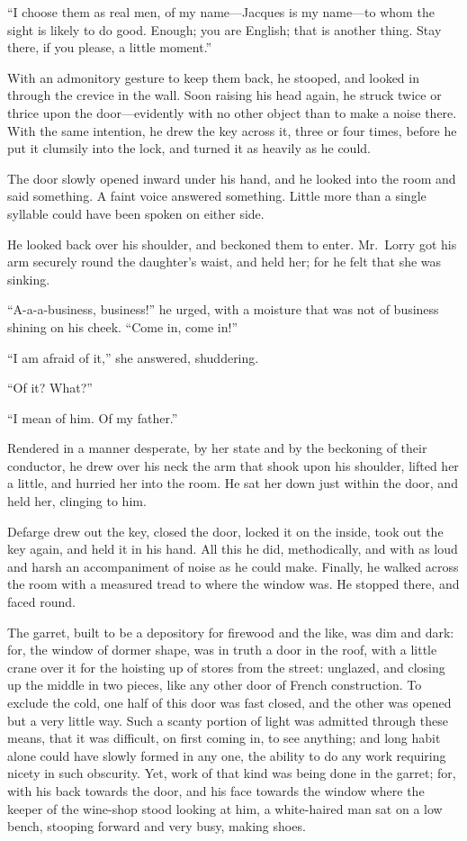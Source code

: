 ``I choose them as real men, of my name---Jacques is my name---to whom
the sight is likely to do good.  Enough; you are English; that is
another thing.  Stay there, if you please, a little moment.''

With an admonitory gesture to keep them back, he stooped, and looked
in through the crevice in the wall.  Soon raising his head again, he
struck twice or thrice upon the door---evidently with no other object
than to make a noise there.  With the same intention, he drew the key
across it, three or four times, before he put it clumsily into the
lock, and turned it as heavily as he could.

The door slowly opened inward under his hand, and he looked into the
room and said something.  A faint voice answered something.  Little
more than a single syllable could have been spoken on either side.

He looked back over his shoulder, and beckoned them to enter.
Mr.\ Lorry got his arm securely round the daughter's waist, and held
her; for he felt that she was sinking.

``A-a-a-business, business!'' he urged, with a moisture that was not of
business shining on his cheek.  ``Come in, come in!''

``I am afraid of it,'' she answered, shuddering.

``Of it?  What?''

``I mean of him.  Of my father.''

Rendered in a manner desperate, by her state and by the beckoning of
their conductor, he drew over his neck the arm that shook upon his
shoulder, lifted her a little, and hurried her into the room.  He sat
her down just within the door, and held her, clinging to him.

Defarge drew out the key, closed the door, locked it on the inside,
took out the key again, and held it in his hand.  All this he did,
methodically, and with as loud and harsh an accompaniment of noise as
he could make.  Finally, he walked across the room with a measured
tread to where the window was.  He stopped there, and faced round.

The garret, built to be a depository for firewood and the like, was
dim and dark:  for, the window of dormer shape, was in truth a door in
the roof, with a little crane over it for the hoisting up of stores
from the street:  unglazed, and closing up the middle in two pieces,
like any other door of French construction.  To exclude the cold, one
half of this door was fast closed, and the other was opened but a
very little way.  Such a scanty portion of light was admitted through
these means, that it was difficult, on first coming in, to see
anything; and long habit alone could have slowly formed in any one,
the ability to do any work requiring nicety in such obscurity.  Yet,
work of that kind was being done in the garret; for, with his back
towards the door, and his face towards the window where the keeper of
the wine-shop stood looking at him, a white-haired man sat on a low
bench, stooping forward and very busy, making shoes.



